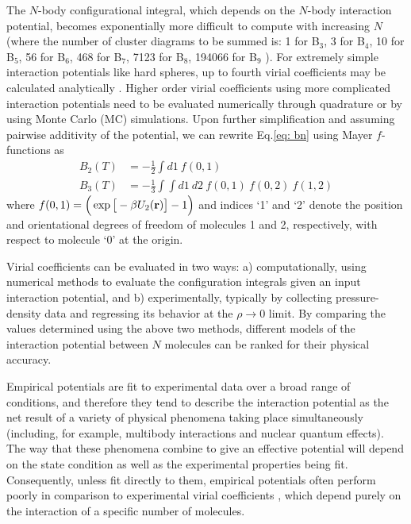         The $N$-body configurational integral, which depends on the $N$-body interaction potential, becomes exponentially more difficult to compute with increasing $N$ (where the number of cluster diagrams to be summed is: 1 for B$_3$, 3 for B$_4$, 10 for B$_5$, 56 for B$_6$, 468 for B$_7$, 7123 for B$_8$, 194066 for B$_9$ \cite{ShaulPhD,Masters2008,Labik2005}). For extremely simple interaction potentials like hard spheres, up to fourth virial coefficients may be calculated analytically \cite{Masters2008}. Higher order virial coefficients using more complicated interaction potentials need to be evaluated numerically through quadrature or by using Monte Carlo (MC) simulations. Upon further simplification and assuming pairwise additivity of the potential, we can rewrite Eq.\eqref{eq: bn} using Mayer $f$-functions as \cite{Masters2008,Hansen}
        \begin{equation} \label{eq: mayerfn}
            \begin{aligned}
                B_2(T) &= -\frac{1}{2} \displaystyle\int d1 ~ f(0,1)\\
                B_3(T) &= -\frac{1}{3} \displaystyle\int \int d1~d2~f(0,1)~f(0,2)~f(1,2)
            \end{aligned}
        \end{equation}
        where $f(0,1) = \Big( \exp \big[ -\beta U_2({\mathbf {r}}) \big] - 1 \Big) $ and indices `1' and `2' denote the position and orientational degrees of freedom of molecules 1 and 2, respectively, with respect to molecule `0' at the origin.

        Virial coefficients can be evaluated in two ways: a) computationally, using numerical methods to evaluate the configuration integrals given an input interaction potential, and b) experimentally, typically by collecting pressure-density data and regressing its behavior at the $\rho \to 0$ limit. By comparing the values determined using the above two methods, different models of the interaction potential between $N$ molecules can be ranked for their physical accuracy.

        Empirical potentials are fit to experimental data over a broad range of conditions, and therefore they tend to describe the interaction potential as the net result of a variety of physical phenomena taking place simultaneously (including, for example, multibody interactions and nuclear quantum effects). The way that these phenomena combine to give an effective potential will depend on the state condition as well as the experimental properties being fit. Consequently, unless fit directly to them, empirical potentials often perform poorly in comparison to experimental virial coefficients \cite{Benjamin2007}, which depend purely on the interaction of a specific number of molecules.

